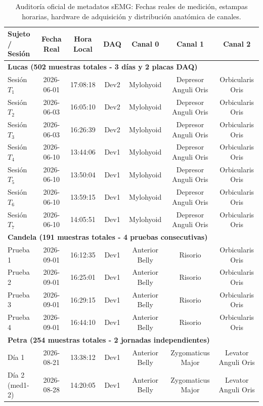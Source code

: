 \documentclass[11pt,a4paper]{article}
\begin{document}
\begin{table}[H]
\centering
\small
\begin{tabular}{lcccccc}
\toprule
\textbf{Sujeto / Sesión} & \textbf{Fecha Real} & \textbf{Hora Local} & \textbf{DAQ} & \textbf{Canal 0} & \textbf{Canal 1} & \textbf{Canal 2} \\
\midrule
\multicolumn{7}{l}{\textbf{Lucas (502 muestras totales - 3 días y 2 placas DAQ)}} \\
\midrule
Sesión $T_1$ & 2026-06-01 & 17:08:18 & Dev2 & Mylohyoid & Depresor Anguli Oris & Orbicularis Oris \\
Sesión $T_2$ & 2026-06-03 & 16:05:10 & Dev2 & Mylohyoid & Depresor Anguli Oris & Orbicularis Oris \\
Sesión $T_3$ & 2026-06-03 & 16:26:39 & Dev2 & Mylohyoid & Depresor Anguli Oris & Orbicularis Oris \\
Sesión $T_4$ & 2026-06-10 & 13:44:06 & Dev1 & Mylohyoid & Depresor Anguli Oris & Orbicularis Oris \\
Sesión $T_5$ & 2026-06-10 & 13:50:04 & Dev1 & Mylohyoid & Depresor Anguli Oris & Orbicularis Oris \\
Sesión $T_6$ & 2026-06-10 & 13:59:15 & Dev1 & Mylohyoid & Depresor Anguli Oris & Orbicularis Oris \\
Sesión $T_7$ & 2026-06-10 & 14:05:51 & Dev1 & Mylohyoid & Depresor Anguli Oris & Orbicularis Oris \\
\midrule
\multicolumn{7}{l}{\textbf{Candela (191 muestras totales - 4 pruebas consecutivas)}} \\
\midrule
Prueba 1 & 2026-09-01 & 16:12:35 & Dev1 & Anterior Belly & Risorio & Orbicularis Oris \\
Prueba 2 & 2026-09-01 & 16:25:01 & Dev1 & Anterior Belly & Risorio & Orbicularis Oris \\
Prueba 3 & 2026-09-01 & 16:29:15 & Dev1 & Anterior Belly & Risorio & Orbicularis Oris \\
Prueba 4 & 2026-09-01 & 16:44:10 & Dev1 & Anterior Belly & Risorio & Orbicularis Oris \\
\midrule
\multicolumn{7}{l}{\textbf{Petra (254 muestras totales - 2 jornadas independientes)}} \\
\midrule
Día 1 & 2026-08-21 & 13:38:12 & Dev1 & Anterior Belly & Zygomaticus Major & Levator Anguli Oris \\
Día 2 (med1-2) & 2026-08-28 & 14:20:05 & Dev1 & Anterior Belly & Zygomaticus Major & Levator Anguli Oris \\
\bottomrule
\end{tabular}
\caption{Auditoría oficial de metadatos sEMG: Fechas reales de medición, estampas horarias, hardware de adquisición y distribución anatómica de canales.}
\label{tab:auditoria_hardware_longitudinal}
\end{table}
\end{document}
